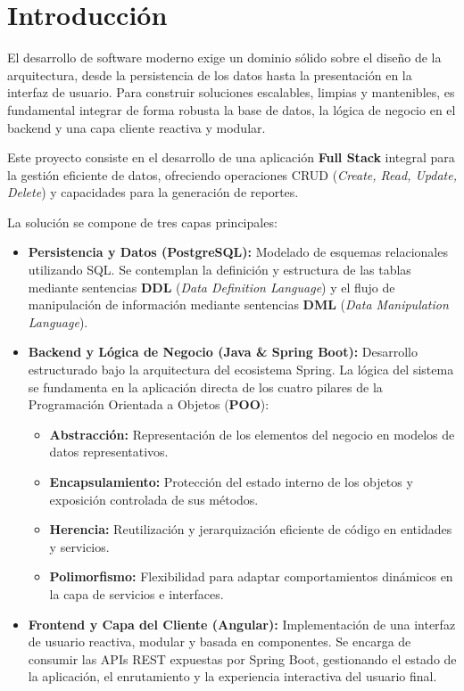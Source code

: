 \section{Introducción}

El desarrollo de software moderno exige un dominio sólido sobre el diseño de la arquitectura, desde la persistencia de los datos hasta la presentación en la interfaz de usuario. Para construir soluciones escalables, limpias y mantenibles, es fundamental integrar de forma robusta la base de datos, la lógica de negocio en el backend y una capa cliente reactiva y modular.

Este proyecto consiste en el desarrollo de una aplicación \textbf{Full Stack} integral para la gestión eficiente de datos, ofreciendo operaciones CRUD (\textit{Create, Read, Update, Delete}) y capacidades para la generación de reportes.

La solución se compone de tres capas principales:

\begin{itemize}
    \item \textbf{Persistencia y Datos (PostgreSQL):} Modelado de esquemas relacionales utilizando SQL. Se contemplan la definición y estructura de las tablas mediante sentencias \textbf{DDL} (\textit{Data Definition Language}) y el flujo de manipulación de información mediante sentencias \textbf{DML} (\textit{Data Manipulation Language}).
    
    \item \textbf{Backend y Lógica de Negocio (Java \& Spring Boot):} Desarrollo estructurado bajo la arquitectura del ecosistema Spring. La lógica del sistema se fundamenta en la aplicación directa de los cuatro pilares de la Programación Orientada a Objetos (\textbf{POO}):
    \begin{itemize}
        \item \textbf{Abstracción:} Representación de los elementos del negocio en modelos de datos representativos.
        \item \textbf{Encapsulamiento:} Protección del estado interno de los objetos y exposición controlada de sus métodos.
        \item \textbf{Herencia:} Reutilización y jerarquización eficiente de código en entidades y servicios.
        \item \textbf{Polimorfismo:} Flexibilidad para adaptar comportamientos dinámicos en la capa de servicios e interfaces.
    \end{itemize}

    \item \textbf{Frontend y Capa del Cliente (Angular):} Implementación de una interfaz de usuario reactiva, modular y basada en componentes. Se encarga de consumir las APIs REST expuestas por Spring Boot, gestionando el estado de la aplicación, el enrutamiento y la experiencia interactiva del usuario final.
\end{itemize}

